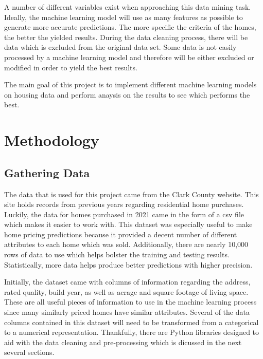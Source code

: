 \documentclass[12pt]{article}
\begin{document}
    A number of different variables exist when approaching this data mining task. Ideally, the machine learning model 
    will use as many features as possible to generate more accurate predictions. The more specific the criteria 
    of the homes, the better the yielded results. During the data cleaning process, there will be data which is excluded 
    from the original data set. Some data is not easily processed by a machine learning model and therefore
    will be either excluded or modified in order to yield the best results. 

    The main goal of this project is to implement different machine learning models on housing data and perform anaysis on the results 
    to see which performs the best.

\section{Methodology}
    \subsection{Gathering Data}
    The data that is used for this project came from the Clark County website\cite{cc_data}. This site holds records from previous
    years regarding residential home purchases. Luckily, the data for homes purchased in 2021 came in the form of a csv file which makes it easier to work with. 
    This dataset was especially useful to make home pricing predictions because it provided a decent number of different attributes 
    to each home which was sold. Additionally, there are nearly 10,000 rows of data to use which helps bolster the training and testing 
    results. Statistically, more data helps produce better predictions with higher precision.

    Initially, the dataset came with columns of information regarding the address, rated quality, build year, as well as 
    acrage and square footage of living space. These are all useful pieces of information to use in the machine learning process 
    since many similarly priced homes have similar attributes. Several of the data columns contained in this dataset will need to be 
    transformed from a categorical to a numerical representation. Thankfully, there are Python libraries designed to aid with the 
    data cleaning and pre-processing which is dicussed in the next several sections. 
\end{document}
